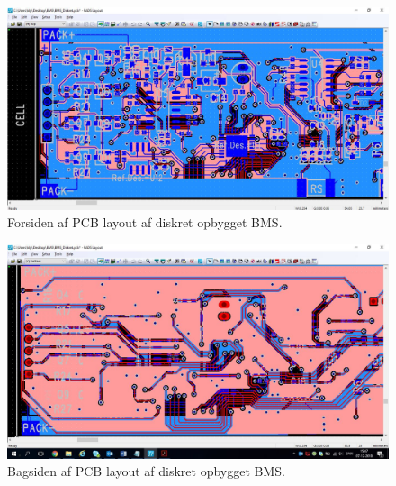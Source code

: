 \begin{figure}[h]
	\centering
	\includegraphics[width=15cm]{billeder/Diskret_1.jpg}
	\caption{Forsiden af PCB layout af diskret opbygget BMS.}
	\label{fig:PCB_IC_bagside}
\end{figure}

\begin{figure}[h]
	\centering
	\includegraphics[width=15cm]{billeder/Diskret_3.jpg}
	\caption{Bagsiden af PCB layout af diskret opbygget BMS.}
	\label{fig:PCB_IC_bagside}
\end{figure}
